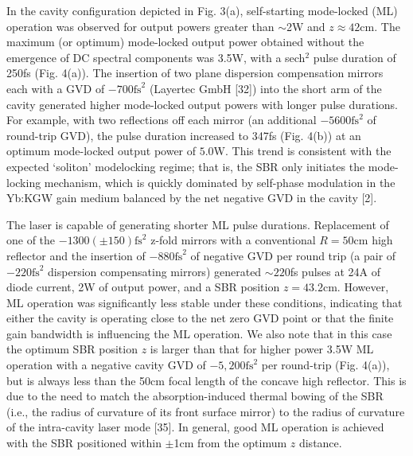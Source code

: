 In the cavity configuration depicted in Fig. 3(a), self-starting mode-locked (ML) operation was observed for output powers greater than $\sim$2W and $z \approx 42$cm.
The maximum (or optimum) mode-locked output power obtained without the emergence of DC spectral components was 3.5W, with a sech$^2$ pulse duration of 250fs (Fig. 4(a)).
The insertion of two plane dispersion compensation mirrors each with a GVD of $-700\text{fs}^2$ (Layertec GmbH [32]) into the short arm of the cavity generated higher mode-locked output powers with longer pulse durations.
For example, with two reflections off each mirror (an additional $-5600\text{fs}^2$ of round-trip GVD), the pulse duration increased to 347fs (Fig. 4(b)) at an optimum mode-locked output power of $5.0$W.
This trend is consistent with the expected ‘soliton’ modelocking regime; that is, the SBR only initiates the mode-locking mechanism, which is quickly dominated by self-phase modulation in the Yb:KGW gain medium balanced by the net negative GVD in the cavity [2].

The laser is capable of generating shorter ML pulse durations.
Replacement of one of the $-1300 ( \pm 150 ) \text{fs}^2$ z-fold mirrors with a conventional $R = 50$cm high reflector and the insertion of $-880\text{fs}^2$ of negative GVD per round trip (a pair of $-220\text{fs}^2$ dispersion compensating mirrors) generated $\sim220$fs pulses at 24A of diode current, 2W of output power, and a SBR position $z = 43.2$cm.
However, ML operation was significantly less stable under these conditions, indicating that either the cavity is operating close to the net zero GVD point or that the finite gain bandwidth is influencing the ML operation.
We also note that in this case the optimum SBR position $z$ is larger than that for higher power 3.5W ML operation with a negative cavity GVD of $-5,200\text{fs}^2$ per round-trip (Fig. 4(a)), but is always less than the 50cm focal length of the concave high reflector.
This is due to the need to match the absorption-induced thermal bowing of the SBR (i.e., the radius of curvature of its front surface mirror) to the radius of curvature of the intra-cavity laser mode [35].
In general, good ML operation is achieved with the SBR positioned within $\pm$1cm from the optimum $z$ distance.

